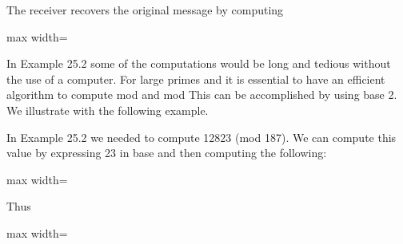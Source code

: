 \documentclass[11pt,oneside]{article}
\begin{document}
\BookNarrativetrue

\begin{BookBody}

\noindent The receiver recovers the original message by computing

\begin{center}\begin{adjustbox}{max width=\linewidth}\end{adjustbox}\end{center} \BookEnd{\blacktriangle}

\noindent In Example 25.2 some of the computations would be long and tedious without the use of a computer. For large primes  and  it is essential to have an efficient algorithm to compute mod  and mod  This can be accomplished by using base 2. We illustrate with the following example.

 In Example 25.2 we needed to compute 12823 (mod 187). We can compute this value by expressing 23 in base  and then computing the following:

\begin{center}\begin{adjustbox}{max width=\linewidth}\end{adjustbox}\end{center}

\noindent Thus

\begin{center}\begin{adjustbox}{max width=\linewidth}\end{adjustbox}\end{center} \BookEnd{\blacktriangle}


\end{BookBody}
\end{document}
